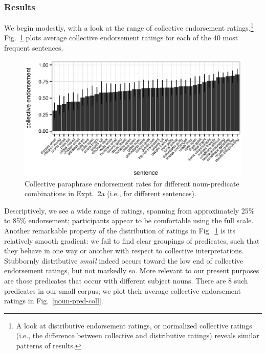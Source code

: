\documentclass[linguex]{sp}
\begin{document}
\subsubsection{Results}

We begin modestly, with a look at the range of collective endorsement ratings.\footnote{A look at distributive endorsement ratings, or normalized collective ratings (i.e., the difference between collective and distributive ratings) reveals similar patterns of results.} Fig.~\ref{sentence-coll} plots average collective endorsement ratings for each of the 40 most frequent sentences.

\begin{figure}[h!]
	\centering
	\includegraphics[width=.985\linewidth]{plots/sentence_plot2.eps}
	\caption{Collective paraphrase endorsement rates for different noun-predicate combinations in Expt.~2a (i.e., for different sentences).} \label{sentence-coll}
\end{figure}

Descriptively, we see a wide range of ratings, spanning from approximately 25\%  to 85\% endorsement; participants appear to be comfortable using the full scale. Another remarkable property of the distribution of ratings in Fig.~\ref{sentence-coll} is its relatively smooth gradient: we fail to find clear groupings of predicates, such that they behave in one way or another with respect to collective interpretations. Stubbornly distributive \emph{small} indeed occurs toward the low end of collective endorsement ratings, but not markedly so.
More relevant to our present purposes are those predicates that occur with different subject nouns. There are 8 such predicates in our small corpus; we plot their average collective endorsement ratings in Fig.~\ref{noun-pred-coll}.
\end{document}
